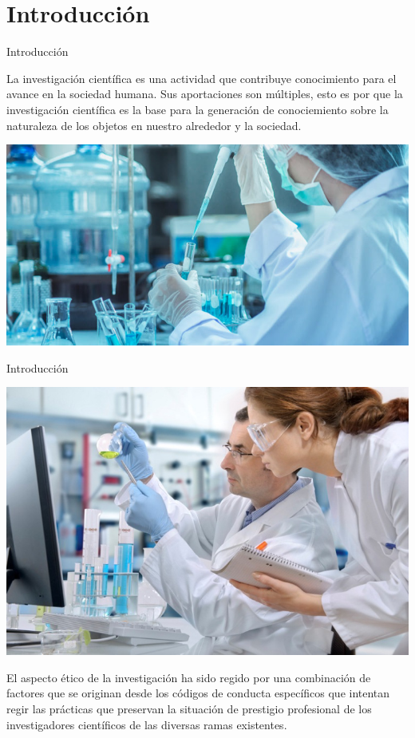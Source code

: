 \section{Introducción}
\begin{frame}{Introducción}
    \begin{minipage}{0.4\linewidth}
    La investigación científica es una actividad que contribuye conocimiento para el avance en la sociedad humana. Sus aportaciones
son múltiples, esto es por que la investigación científica es la base para la generación de conociemiento sobre la naturaleza de los objetos en nuestro
alrededor y la sociedad.
    \end{minipage}
    \hspace{0.4cm}
    \begin{minipage}{0.45\linewidth}
        \centering
        \includegraphics[scale=1.2]{images/ima1.jpg}
    \end{minipage}
\end{frame}
\begin{frame}{Introducción}
    \begin{minipage}{0.45\linewidth}    
        \centering
        \includegraphics[scale=0.22]{images/ima2.jpg}
    \end{minipage}
    \hspace{0.4cm}
    \begin{minipage}{0.45\linewidth}
        El aspecto ético de la investigación ha sido regido por una combinación de factores que se originan desde los códigos de conducta específicos 
que intentan regir las prácticas que preservan la situación de prestigio profesional de los investigadores científicos de las diversas ramas existentes.
    \end{minipage}
\end{frame}

